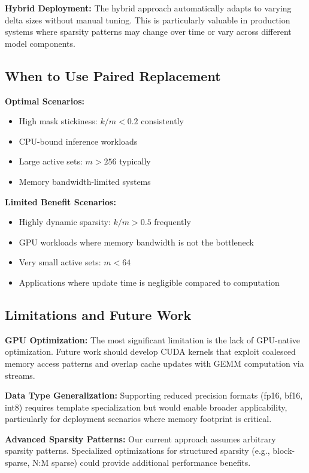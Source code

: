 \documentclass{article}
\numberwithin{equation}{section}
\theoremstyle{plain}
\theoremstyle{definition}
\theoremstyle{remark}
\begin{document}
\textbf{Hybrid Deployment:} The hybrid approach automatically adapts to varying delta sizes without manual tuning. This is particularly valuable in production systems where sparsity patterns may change over time or vary across different model components.

\subsection{When to Use Paired Replacement}

\textbf{Optimal Scenarios:}
\begin{itemize}
    \item High mask stickiness: $k/m < 0.2$ consistently
    \item CPU-bound inference workloads
    \item Large active sets: $m > 256$ typically
    \item Memory bandwidth-limited systems
\end{itemize}

\textbf{Limited Benefit Scenarios:}
\begin{itemize}
    \item Highly dynamic sparsity: $k/m > 0.5$ frequently  
    \item GPU workloads where memory bandwidth is not the bottleneck
    \item Very small active sets: $m < 64$
    \item Applications where update time is negligible compared to computation
\end{itemize}

\subsection{Limitations and Future Work}

\textbf{GPU Optimization:} The most significant limitation is the lack of GPU-native optimization. Future work should develop CUDA kernels that exploit coalesced memory access patterns and overlap cache updates with GEMM computation via streams.

\textbf{Data Type Generalization:} Supporting reduced precision formats (fp16, bf16, int8) requires template specialization but would enable broader applicability, particularly for deployment scenarios where memory footprint is critical.

\textbf{Advanced Sparsity Patterns:} Our current approach assumes arbitrary sparsity patterns. Specialized optimizations for structured sparsity (e.g., block-sparse, N:M sparse) could provide additional performance benefits.
\end{document}
